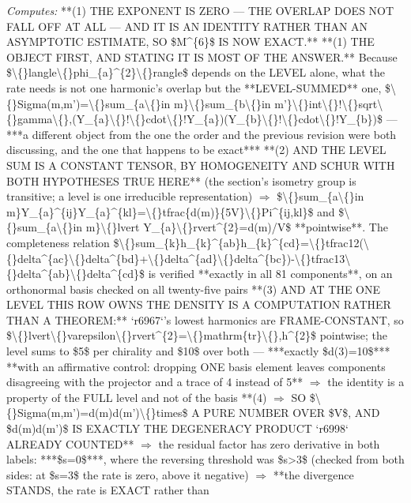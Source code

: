 \begin{description}
\emph{Computes:} **(1) THE EXPONENT IS ZERO --- THE OVERLAP DOES NOT FALL OFF AT ALL --- AND IT IS AN IDENTITY RATHER THAN AN ASYMPTOTIC ESTIMATE, SO \$M\textasciicircum{}\{6\}\$ IS NOW EXACT.**  **(1) THE OBJECT FIRST, AND STATING IT IS MOST OF THE ANSWER.** Because \$\textbackslash\{\}langle\textbackslash\{\}phi\_\{a\}\textasciicircum{}\{2\}\textbackslash\{\}rangle\$ depends on the LEVEL alone, what the rate needs is not one harmonic's overlap but the **LEVEL-SUMMED** one, \$\textbackslash\{\}Sigma(m,m')=\textbackslash\{\}sum\_\{a\textbackslash\{\}in m\}\textbackslash\{\}sum\_\{b\textbackslash\{\}in m'\}\textbackslash\{\}int\textbackslash\{\}!\textbackslash\{\}sqrt\textbackslash\{\}gamma\textbackslash\{\},(Y\_\{a\}\textbackslash\{\}!\textbackslash\{\}cdot\textbackslash\{\}!Y\_\{a\})(Y\_\{b\}\textbackslash\{\}!\textbackslash\{\}cdot\textbackslash\{\}!Y\_\{b\})\$ --- ***a different object from the one the order and the previous revision were both discussing, and the one that happens to be exact***  **(2)  AND THE LEVEL SUM IS A CONSTANT TENSOR, BY HOMOGENEITY AND SCHUR WITH BOTH HYPOTHESES TRUE HERE** (the section's isometry group is transitive; a level is one irreducible representation) \ensuremath{\Rightarrow} \$\textbackslash\{\}sum\_\{a\textbackslash\{\}in m\}Y\_\{a\}\textasciicircum{}\{ij\}Y\_\{a\}\textasciicircum{}\{kl\}=\textbackslash\{\}tfrac\{d(m)\}\{5V\}\textbackslash\{\}Pi\textasciicircum{}\{ij,kl\}\$ and \$\textbackslash\{\}sum\_\{a\textbackslash\{\}in m\}\textbackslash\{\}lvert Y\_\{a\}\textbackslash\{\}rvert\textasciicircum{}\{2\}=d(m)/V\$ **pointwise**. The completeness relation \$\textbackslash\{\}sum\_\{k\}h\_\{k\}\textasciicircum{}\{ab\}h\_\{k\}\textasciicircum{}\{cd\}=\textbackslash\{\}tfrac12(\textbackslash\{\}delta\textasciicircum{}\{ac\}\textbackslash\{\}delta\textasciicircum{}\{bd\}+\textbackslash\{\}delta\textasciicircum{}\{ad\}\textbackslash\{\}delta\textasciicircum{}\{bc\})-\textbackslash\{\}tfrac13\textbackslash\{\}delta\textasciicircum{}\{ab\}\textbackslash\{\}delta\textasciicircum{}\{cd\}\$ is verified **exactly in all 81 components**, on an orthonormal basis checked on all twenty-five pairs  **(3) AND AT THE ONE LEVEL THIS ROW OWNS THE DENSITY IS A COMPUTATION RATHER THAN A THEOREM:** `r6967`'s lowest harmonics are FRAME-CONSTANT, so \$\textbackslash\{\}lvert\textbackslash\{\}varepsilon\textbackslash\{\}rvert\textasciicircum{}\{2\}=\textbackslash\{\}mathrm\{tr\}\textbackslash\{\},h\textasciicircum{}\{2\}\$ pointwise; the level sums to \$5\$ per chirality and \$10\$ over both --- ***exactly \$d(3)=10\$***  **with an affirmative control: dropping ONE basis element leaves components disagreeing with the projector and a trace of 4 instead of 5** \ensuremath{\Rightarrow} the identity is a property of the FULL level and not of the basis  **(4)  \ensuremath{\Rightarrow} SO \$\textbackslash\{\}Sigma(m,m')=d(m)d(m')\textbackslash\{\}times\$ A PURE NUMBER OVER \$V\$, AND \$d(m)d(m')\$ IS EXACTLY THE DEGENERACY PRODUCT `r6998` ALREADY COUNTED** \ensuremath{\Rightarrow} the residual factor has zero derivative in both labels: ***\$s=0\$***, where the reversing threshold was \$s>3\$ (checked from both sides: at \$s=3\$ the rate is zero, above it negative) \ensuremath{\Rightarrow} **the divergence STANDS, the rate is EXACT rather than 
\end{description}
